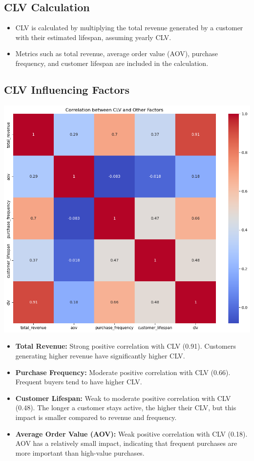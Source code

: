 \documentclass{article}
\begin{document}
    \subsection{CLV Calculation}
    \begin{itemize}
        \item CLV is calculated by multiplying the total revenue generated by a customer with their estimated lifespan, assuming yearly CLV.
        \item Metrics such as total revenue, average order value (AOV), purchase frequency, and customer lifespan are included in the calculation.
    \end{itemize}
    
    \subsection{CLV Influencing Factors}
    \begin{center}
        \includegraphics[width=1\columnwidth]{images/clf-factor.png}
    \end{center}
    \begin{itemize}
        \item \textbf{Total Revenue:} Strong positive correlation with CLV (0.91). Customers generating higher revenue have significantly higher CLV.
        \item \textbf{Purchase Frequency:} Moderate positive correlation with CLV (0.66). Frequent buyers tend to have higher CLV.
        \item \textbf{Customer Lifespan:} Weak to moderate positive correlation with CLV (0.48). The longer a customer stays active, the higher their CLV, but this impact is smaller compared to revenue and frequency.
        \item \textbf{Average Order Value (AOV):} Weak positive correlation with CLV (0.18). AOV has a relatively small impact, indicating that frequent purchases are more important than high-value purchases.
    \end{itemize}
    
\end{document}
